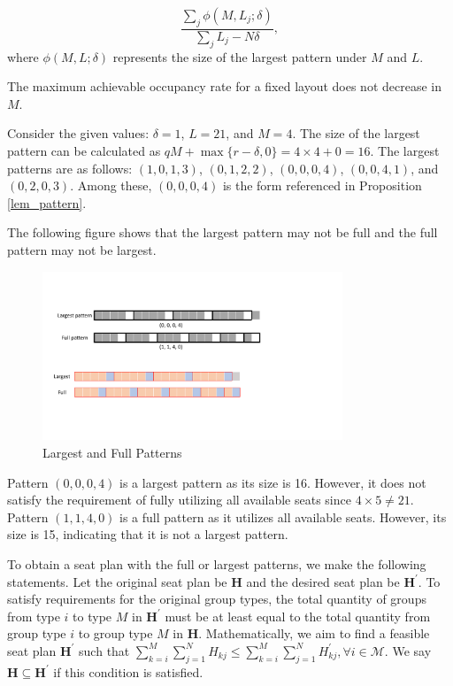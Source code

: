 $$\frac{\sum_{j}\phi(M, L_{j}; \delta)}{\sum_{j} L_{j}- N \delta},$$
where $\phi(M, L; \delta)$ represents the size of the largest pattern under $M$ and $L$. 

\begin{corollary}\label{maximum_or}
    The maximum achievable occupancy rate for a fixed layout does not decrease in $M$.
\end{corollary}


\begin{example}
Consider the given values: $\delta = 1$, $L = 21$, and $M = 4$. The size of the largest pattern can be calculated as $qM + \max\{r-\delta, 0\} = 4 \times 4 + 0 = 16$. The largest patterns are as follows: $(1, 0, 1, 3)$, $(0, 1, 2, 2)$, $(0, 0, 0, 4)$, $(0, 0, 4, 1)$, and $(0, 2, 0, 3)$. Among these, $(0, 0, 0, 4)$ is the form referenced in Proposition \ref{lem_pattern}.

The following figure shows that the largest pattern may not be full and the full pattern may not be largest.
\begin{figure}[ht]
    \centering
        \includegraphics[width=0.8\textwidth]{./Figures/largest_full.pdf}
    \caption{Largest and Full Patterns}
\end{figure}

Pattern $(0, 0, 0, 4)$ is a largest pattern as its size is 16. However, it does not satisfy the requirement of fully utilizing all available seats since $4 \times 5 \neq 21$. Pattern $(1, 1, 4, 0)$ is a full pattern as it utilizes all available seats. However, its size is 15, indicating that it is not a largest pattern.
\end{example}

To obtain a seat plan with the full or largest patterns, we make the following statements.
Let the original seat plan be $\bm{H}$ and the desired seat plan be $\bm{H}^{\prime}$. To satisfy requirements for the original group types, the total quantity of groups from type $i$ to type $M$ in $\bm{H}^{\prime}$ must be at least equal to the total quantity from group type $i$ to group type $M$ in $\bm{H}$. Mathematically, we aim to find a feasible seat plan $\bm{H}^{\prime}$ such that $\sum_{k=i}^{M} \sum_{j=1}^{N} H_{kj} \leq \sum_{k=i}^{M} \sum_{j=1}^{N} H^{\prime}_{kj}, \forall i \in \mathcal{M}$. We say $\bm{H} \subseteq \bm{H}^{\prime}$ if this condition is satisfied.

